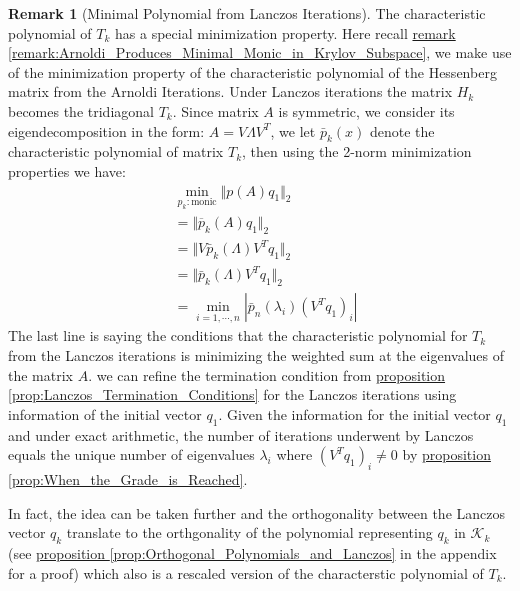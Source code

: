 \documentclass[]{article}
\theoremstyle{definition}
\newtheorem{remark}{Remark}[subsection]  %
\begin{document}
            \begin{remark}[Minimal Polynomial from Lanczos Iterations]\label{remark:Minimal_Polynomial_from_Lanczos_Iterations}
                The characteristic polynomial of $T_k$ has a special minimization property. Here recall \hyperref[remark:Arnoldi_Produces_Minimal_Monic_in_Krylov_Subspace]{remark \ref*{remark:Arnoldi_Produces_Minimal_Monic_in_Krylov_Subspace}}, we make use of the minimization property of the characteristic polynomial of the Hessenberg matrix from the Arnoldi Iterations. Under Lanczos iterations the matrix $H_k$ becomes the tridiagonal $T_k$. Since matrix $A$ is symmetric, we consider its eigendecomposition in the form: $A = V\Lambda V^T$, we let $\bar{p}_k(x)$ denote the characteristic polynomial of matrix $T_k$, then using the 2-norm minimization properties we have: 
                \begin{align}
                    & \min_{p_k:\text{monic}} \Vert p(A)q_1\Vert_2
                    \\
                    & =\Vert \overline{p}_k(A)q_1\Vert_2
                    \\
                    & = \Vert V \bar{p}_k(\Lambda)V^Tq_1\Vert_2
                    \\
                    & = \Vert \bar{p}_k(\Lambda)V^Tq_1\Vert_2
                    \\
                    &= \min_{i = 1, \cdots, n} | \bar{p}_n(\lambda_i)(V^Tq_1)_i|
                \end{align}
                The last line is saying the conditions that the characteristic polynomial for $T_k$ from the Lanczos iterations is minimizing the weighted sum at the eigenvalues of the matrix $A$. we can refine the termination condition from \hyperref[prop:Lanczos_Termination_Conditions]{proposition \ref*{prop:Lanczos_Termination_Conditions}} for the Lanczos iterations using information of the initial vector $q_1$. Given the information for the initial vector $q_1$ and under exact arithmetic, the number of iterations underwent by Lanczos equals the unique number of eigenvalues $\lambda_i$ where $(V^Tq_1)_i \neq 0$ by \hyperref[prop:When_the_Grade_is_Reached]{proposition \ref*{prop:When_the_Grade_is_Reached}}. 
                \par
                In fact, the idea can be taken further and the orthogonality between the Lanczos vector $q_k$ translate to the orthgonality of the polynomial representing $q_k$ in $\mathcal K_k$ (see \hyperref[prop:Orthogonal_Polynomials_and_Lanczos]{proposition \ref*{prop:Orthogonal_Polynomials_and_Lanczos}} in the appendix for a proof) which also is a rescaled version of the characterstic polynomial of $T_k$. 
            \end{remark}
            
\end{document}
